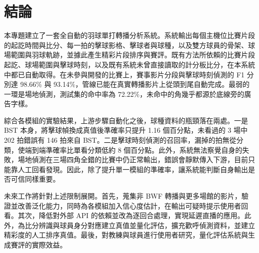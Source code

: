 \section{結論}
\label{sec:conclusion}

本專題建立了一套全自動的羽球單打轉播分析系統。系統輸出每個主機位比賽片段的起訖時間與比分、每一拍的擊球影格、擊球者與球種，以及雙方球員的骨架、球場範圍與羽球軌跡，並據此產生精彩片段排序與賽評。既有方法所依賴的比賽片段起訖、球場範圍與擊球時刻，以及既有系統未曾直接讀取的計分板比分，在本系統中都已自動取得。在未參與開發的比賽上，賽事影片分段與擊球時刻偵測的 F1 分別達 98.66\% 與 93.14\%，管線已能在真實轉播影片上從頭到尾自動完成。最弱的一環是場地偵測，測試集的命中率為 72.22\%，未命中的角幾乎都源於底線旁的廣告字樣。

綜合各模組的實驗結果，上游步驟自動化之後，球種資料的瓶頸落在兩處。一是 BST 本身，將擊球幀換成真值後準確率只提升 1.16 個百分點，未看過的 3 場中 202 拍錯誤有 146 拍來自 BST。二是擊球時刻偵測的召回率，漏掉的拍無從分類，使端到端準確率比單看分類低約 8 個百分點。此外，系統無法察覺自身的失敗，場地偵測在三場四角全錯的比賽中仍正常輸出，錯誤會靜默傳入下游，目前只能靠人工回看發現。因此，除了提升單一模組的準確率，讓系統能判斷自身輸出是否可信同樣重要。

未來工作將針對上述限制展開。首先，蒐集非 BWF 轉播與更多場館的影片，驗證並改善泛化能力，同時為各模組加入信心度估計，在輸出可疑時提示使用者回看。其次，降低對外部 API 的依賴並改為逐回合處理，實現延遲直播的應用。此外，為比分辨識與球員身分對應建立真值並量化評估，擴充歡呼偵測資料，並建立精彩度的人工排序真值。最後，對教練與球員進行使用者研究，量化評估系統與生成賽評的實際效益。
